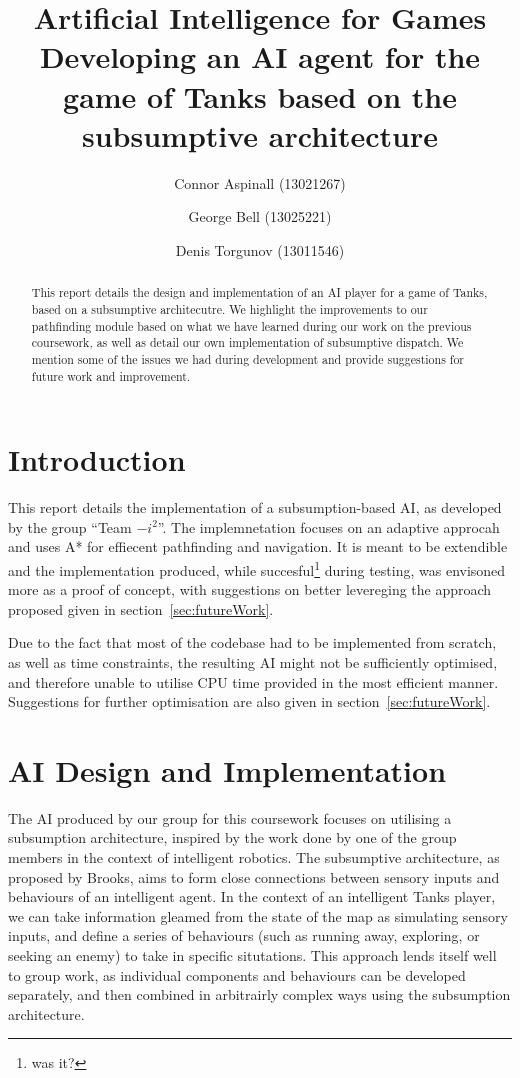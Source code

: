 \documentclass[11pt]{article}
\title{Artificial Intelligence for Games\\
Developing an AI agent for the game of Tanks based on the subsumptive architecture}
\author{Connor Aspinall (13021267) \and George Bell (13025221) \and Denis Torgunov (13011546)}
\date{}
\begin{document}
\newcommand{\includecode}[2][c]{<!---->}
\maketitle
\begin{abstract}
  This report details the design and implementation of an AI player for a game of Tanks, based on a subsumptive architecutre. We highlight the improvements to our pathfinding module based on what we have learned during our work on the previous coursework, as well as detail our own implementation of subsumptive dispatch. We mention some of the issues we had during development and provide suggestions for future work and improvement.
\end{abstract}
\tableofcontents
\thispagestyle{empty}

\newpage

\section{Introduction}
This report details the implementation of a subsumption-based AI, as developed by the group ``Team \(-i^2\)''. The implemnetation focuses on an adaptive approcah and uses A* for effiecent pathfinding and navigation. It is meant to be extendible and the implementation produced, while succesful\footnote{was it?} during testing, was envisoned more as a proof of concept, with suggestions on better levereging the approach proposed given in section~\ref{sec:futureWork}.

Due to the fact that most of the codebase had to be implemented from scratch, as well as time constraints, the resulting AI might not be sufficiently optimised, and therefore unable to utilise CPU time provided in the most efficient manner. Suggestions for further optimisation are also given in section~\ref{sec:futureWork}.

\section{AI Design and Implementation} \label{sec:design}

The AI produced by our group for this coursework focuses on utilising a subsumption architecture, inspired by the work done by one of the group members in the context of intelligent robotics. The subsumptive architecture, as proposed by Brooks, aims to form close connections between sensory inputs and behaviours of an intelligent agent\cite{brooks1}. In the context of an intelligent Tanks player, we can take information gleamed from the state of the map as simulating sensory inputs, and define a series of behaviours (such as running away, exploring, or seeking an enemy) to take in specific situtations. This approach lends itself well to group work, as individual components and behaviours can be developed separately, and then combined in arbitrairly complex ways using the subsumption architecture.
\end{document}
